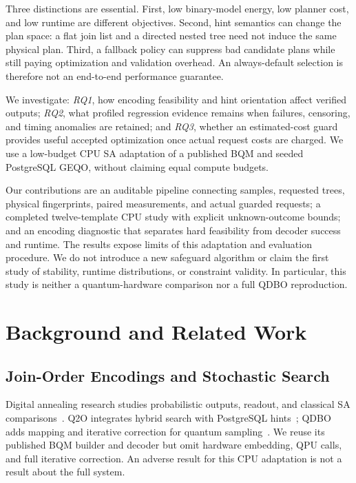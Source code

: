 \documentclass[conference]{IEEEtran}
\begin{document}
Three distinctions are essential. First, low binary-model energy, low planner
cost, and low runtime are different objectives. Second, hint semantics can change
the plan space: a flat join list and a directed nested tree need not induce the
same physical plan. Third, a fallback policy can suppress bad candidate plans
while still paying optimization and validation overhead. An always-default
selection is therefore not an end-to-end performance guarantee.

We investigate: \emph{RQ1}, how encoding feasibility and hint orientation affect
verified outputs; \emph{RQ2}, what profiled regression evidence remains when
failures, censoring, and timing anomalies are retained; and \emph{RQ3}, whether
an estimated-cost guard provides useful accepted optimization once actual request
costs are charged. We use a low-budget CPU SA adaptation of a published BQM and
seeded PostgreSQL GEQO, without claiming equal compute budgets.

Our contributions are an auditable pipeline connecting samples, requested trees,
physical fingerprints, paired measurements, and actual guarded requests; a
completed twelve-template CPU study with explicit unknown-outcome bounds; and an
encoding diagnostic that separates hard feasibility from decoder success and
runtime. The results expose limits of this adaptation and evaluation procedure.
We do not introduce a new safeguard algorithm or claim the first study of
stability, runtime distributions, or constraint validity. In particular, this
study is neither a quantum-hardware comparison nor a full QDBO reproduction.

\section{Background and Related Work}
\subsection{Join-Order Encodings and Stochastic Search}
Digital annealing research studies probabilistic outputs, readout, and classical
SA comparisons~\cite{schonberger2023digital}. Q2O integrates hybrid search with
PostgreSQL hints~\cite{liu2025q2o}; QDBO adds mapping and iterative correction for
quantum sampling~\cite{liu2026qdbo}. We reuse its published BQM builder and
decoder but omit hardware embedding, QPU calls, and full iterative correction.
An adverse result for this CPU adaptation is not a result about the full system.
\end{document}
